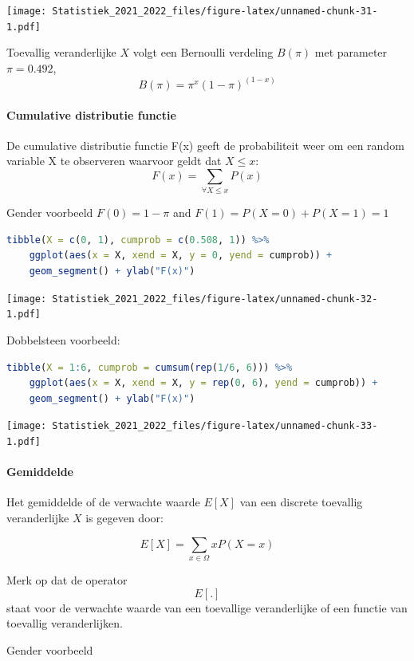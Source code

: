 \documentclass[
  12pt,dutch,coursenotes]{book}
\theoremstyle{definition}
\theoremstyle{definition}
\theoremstyle{definition}
\theoremstyle{definition}
\theoremstyle{remark}
\begin{document}
\texttt{[image: Statistiek\_2021\_2022\_files/figure-latex/unnamed-chunk-31-1.pdf]}

Toevallig veranderlijke \(X\) volgt een Bernoulli verdeling \(B(\pi)\) met parameter \(\pi=0.492\),
\[B(\pi)= \pi^x(1-\pi)^{(1-x)}\]

\hypertarget{cumulative-distributie-functie}{%
\paragraph{Cumulative distributie functie}\label{cumulative-distributie-functie}}

De cumulative distributie functie F(x) geeft de probabiliteit weer om een random variable X te observeren waarvoor geldt dat \(X\leq x\):
\[ F(x) = \sum\limits_{\forall X\leq x} P(x)\]

Gender voorbeeld \(F(0)=1-\pi\) and \(F(1)= P(X=0) + P(X=1)=1\)

\begin{lstlisting}[language=R]
tibble(X = c(0, 1), cumprob = c(0.508, 1)) %>%
    ggplot(aes(x = X, xend = X, y = 0, yend = cumprob)) +
    geom_segment() + ylab("F(x)")
\end{lstlisting}

\texttt{[image: Statistiek\_2021\_2022\_files/figure-latex/unnamed-chunk-32-1.pdf]}

Dobbelsteen voorbeeld:

\begin{lstlisting}[language=R]
tibble(X = 1:6, cumprob = cumsum(rep(1/6, 6))) %>%
    ggplot(aes(x = X, xend = X, y = rep(0, 6), yend = cumprob)) +
    geom_segment() + ylab("F(x)")
\end{lstlisting}

\texttt{[image: Statistiek\_2021\_2022\_files/figure-latex/unnamed-chunk-33-1.pdf]}

\hypertarget{gemiddelde}{%
\paragraph{Gemiddelde}\label{gemiddelde}}

Het gemiddelde of de verwachte waarde \(E[X]\) van een discrete toevallig veranderlijke \(X\) is gegeven door:

\[E[X]=\sum\limits_{x\in\Omega} x P(X=x)\]

Merk op dat de operator \[E[.]\] staat voor de verwachte waarde van een toevallige veranderlijke of een functie van toevallig veranderlijken.

Gender voorbeeld
\end{document}
